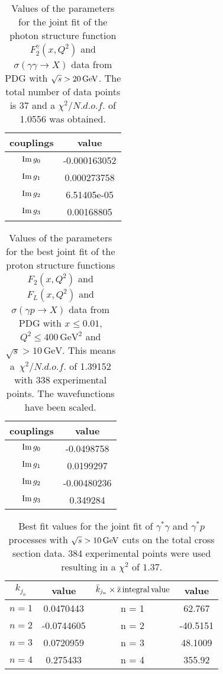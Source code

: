 \documentclass[preprint, 12pt]{elsarticle}
\begin{document}
\begin{table}[b!]
\centering
\caption{Values of the parameters for the joint fit of the photon structure function $F_2^{\gamma}\left(x, Q^2\right)$ and $\sigma\left(\gamma \gamma \rightarrow X\right)$ data from PDG with $\sqrt{s} > 20 {\rm \, GeV}$. The total number of data points is 37 and a $\chi^2 / {N.d.o.f.}$ of 1.0556 was obtained.}
\vspace{0.5cm}
\begin{tabular}{|c|c|}
\hline
couplings   & value \\
\hline
${\rm Im} \, g_0$  & -0.000163052\\ 
\hline
${\rm Im} \, g_1$  & 0.000273758 \\ 
\hline
${\rm Im} \, g_2$  & 6.51405e-05 \\
\hline
${\rm Im} \, g_3$  & 0.00168805 \\ 
\hline
\end{tabular}
\label{table:GammaGamma_best_joint_fit_scaled_W_gt_20}
\end{table}
\begin{table}[b!]
\centering
\caption{Values of the parameters for the best joint fit of the proton structure functions $F_2\left(x, Q^2\right)$ and $F_L\left(x, Q^2\right)$ and $\sigma\left(\gamma p \rightarrow X\right)$ data from PDG with $x \leq 0.01$, $Q^2 \leq 400 \, \text{GeV}^2$ and $\sqrt{s} > 10 \, \text{GeV}$. This means a~$\chi^2 / {N.d.o.f.}$ of 1.39152 with 338 experimental points. The wavefunctions have been scaled.}
\vspace{0.5cm}
\begin{tabular}{|c|c|}
\hline
couplings   & value \\
\hline
${\rm Im} \, g_0$  & -0.0498758\\ 
\hline
${\rm Im} \, g_1$  & 0.0199297 \\ 
\hline
${\rm Im} \, g_2$  & -0.00480236 \\
\hline
${\rm Im} \, g_3$  & 0.349284 \\ 
\hline
\end{tabular}
\label{table:GammaProton_best_joint_fit_scaled_W_gt_10}
\end{table}
\begin{table}[b!]
\centering
\caption{Best fit values for the joint fit of $\gamma^*\gamma$ and $\gamma^*p$ processes with $\sqrt{s} > 10 \, {\rm GeV }$ cuts on the total cross section data. 384 experimental points were used resulting in a $\chi^2$ of $1.37$.}
\begin{tabular}{|c|c|c|c|}
\hline
$k_{j_n}$ & value & $\bar{k}_{j_n} \times \rm{\bar{z} \, integral \, value}$ & value \\
\hline
$n = 1$ & 0.0470443 & n = 1 & 62.767 \\
\hline
$n = 2$ & -0.0744605 & n = 2 & -40.5151 \\
\hline
$n = 3$ & 0.0720959 & n = 3 & 48.1009 \\
\hline
$n = 4$ & 0.275433 & n = 4 & 355.92 \\
\hline
\end{tabular}
\label{table:GammaGamma_GammaProton_best_joint_fit_W_gt_10}
\end{table}
\end{document}
